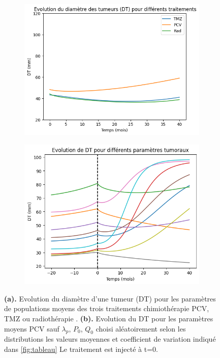 \documentclass[12pt]{article}
\begin{document}
\begin{figure}
    \centering
    \begin{subfigure}[t]{0.45\textwidth}
        \centering
        \includegraphics[width=\linewidth]{Image/evolution_TD_param_moy.png} 
        \caption{} \label{fig:evol_moy}
    \end{subfigure}
    \hfill
    \begin{subfigure}[t]{0.45\textwidth}
        \centering
        \includegraphics[width=\linewidth]{Image/ex_traj.png} 
        \caption{} \label{fig:rand_traj}
    \end{subfigure}

    \caption{\textbf{(a).} Evolution du diamètre d'une tumeur (DT) pour les paramètres de populations moyens des trois traitements chimiothérapie PCV, TMZ ou radiothérapie \cite{}. \textbf{(b).} Evolution du DT pour les paramètres moyens PCV sauf $\lambda_{p}$, $P_{0}$, $Q_{0}$ choisi aléatoirement selon les distributions les valeurs moyennes et coefficient de variation indiqué dans \ref{fig:tableau} Le traitement est injecté à t=0. }
\end{figure}
\end{document}
